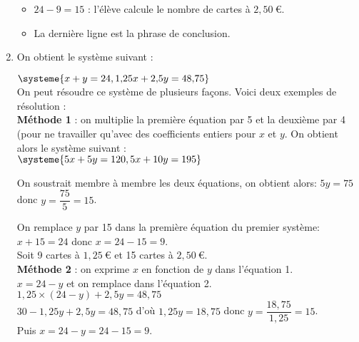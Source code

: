 \begin{enumerate}
\begin{itemize}[itemsep=1em, label=$\bullet$]
    	\item $24-9=15$ : l'élève calcule le nombre de cartes à $2,50~\text{€}$.
    	
    	\item La dernière ligne est la phrase de conclusion.
    \end{itemize}
    
    \item On obtient le système suivant :
    
    \medskip
   $\systeme{x+y=24,1\text{,}25x+2\text{,}5y=48\text{,}75}$\\
   
   On peut résoudre ce système de plusieurs façons. Voici deux exemples de résolution :\\
   
   \textbf{Méthode 1} : on multiplie la première équation par 5 et la deuxième par 4 (pour ne travailler qu'avec des coefficients entiers pour $x$ et $y$. On obtient alors le système suivant :\\
   $\systeme{5x+5y=120,5x+10y=195}$
   
   \medskip
   On soustrait membre à membre les deux équations, on obtient alors: $5y=75$ donc $y=\dfrac{75}{5}=15$.
   
   On remplace $y$ par 15 dans la première équation du premier système: $x+15=24$ donc $x=24-15=9$. \\Soit 9 cartes à $1,25~\text{€}$ et 15 cartes à $2,50~\text{€}$.\\
   
   \textbf{Méthode 2} : on exprime $x$ en fonction de $y$ dans l'équation 1. \\
   $x=24-y$ et on remplace dans l'équation 2.\\
   $1,25\times (24-y)+2,5y=48,75$\\$30-1,25y+2,5y=48,75$ d'où $1,25y=18,75$ donc $y=\dfrac{18,75}{1,25}=15$.\\Puis $x=24-y=24-15=9$.
  
\end{enumerate}